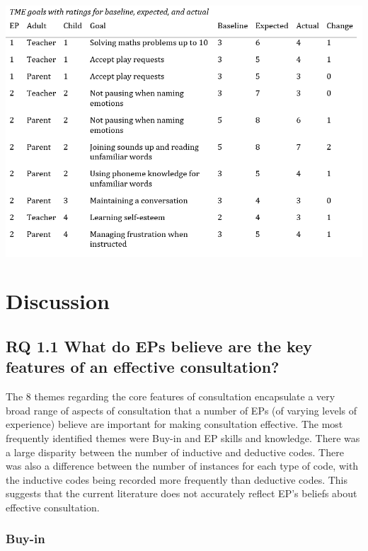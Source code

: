 \documentclass[
  english,
  man,floatsintext]{apa6}
\begin{document}
\includegraphics{Table_2.png}

\hypertarget{discussion}{%
\section{Discussion}\label{discussion}}

\hypertarget{rq-1.1-what-do-eps-believe-are-the-key-features-of-an-effective-consultation}{%
\subsection{RQ 1.1 What do EPs believe are the key features of an effective consultation?}\label{rq-1.1-what-do-eps-believe-are-the-key-features-of-an-effective-consultation}}

The 8 themes regarding the core features of consultation encapsulate a
very broad range of aspects of consultation that a number of EPs (of
varying levels of experience) believe are important for making
consultation effective. The most frequently identified themes were
Buy-in and EP skills and knowledge. There was a large disparity between
the number of inductive and deductive codes. There was also a difference
between the number of instances for each type of code, with the
inductive codes being recorded more frequently than deductive codes.
This suggests that the current literature does not accurately reflect
EP's beliefs about effective consultation.

\hypertarget{buy-in}{%
\subsubsection{Buy-in}\label{buy-in}}
\end{document}
